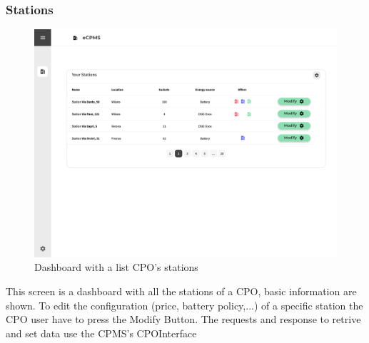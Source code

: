 \subsubsection{Stations}
\begin{center}
    \begin{figure}[H]
        \includegraphics[width=\textwidth]{./img/design/web/home.png}
        \caption{Dashboard with a list CPO's stations}
    \end{figure}
\end{center}
This screen is a dashboard with all the stations of a CPO, basic information are shown. To edit the configuration (price, battery policy,...) of a specific station the CPO user have to press the Modify Button.  The requests and response to retrive and set data use the CPMS's CPOInterface

